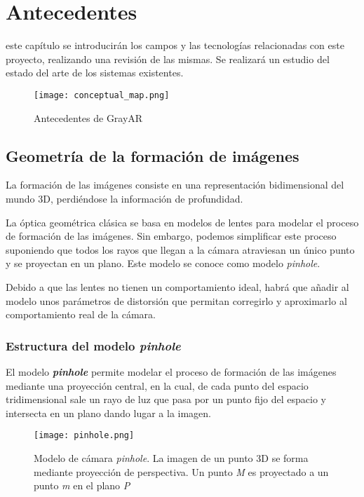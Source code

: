 \chapter{Antecedentes}
\label{chap:antecedentes}

 este capítulo se introducirán los campos y las tecnologías relacionadas con este
proyecto, realizando una revisión de las mismas. Se realizará un estudio del estado del
arte de los sistemas existentes.

\begin{figure}[h!] 
  \centering
  \texttt{[image: conceptual\_map.png]}
  \caption{Antecedentes de GrayAR}
  \label{fig:antecedentes}
\end{figure}


\section{Geometría de la formación de imágenes}
La formación de las imágenes consiste en una representación bidimensional del mundo 3D, perdiéndose la información de profundidad.

La óptica geométrica clásica se basa en modelos de lentes para modelar el proceso de formación de las imágenes. Sin embargo, podemos simplificar este proceso suponiendo que todos los rayos que llegan a la cámara atraviesan un único punto y se proyectan en un plano. Este modelo se conoce como modelo \emph{pinhole}.

Debido a que las lentes no tienen un comportamiento ideal, habrá que añadir al modelo unos parámetros de distorsión que permitan corregirlo y aproximarlo al comportamiento real de la cámara.

\subsection{Estructura del modelo \textit{pinhole}}
El modelo \textbf{\textit{pinhole}} \cite{Hartley} permite modelar el proceso de formación de las imágenes mediante una proyección central, en la cual, de cada punto del espacio tridimensional sale un rayo de luz que pasa por un punto fijo del espacio y intersecta en un plano dando lugar a la imagen.

\begin{figure}[h!]
  \centering
  \texttt{[image: pinhole.png]}
  \caption{Modelo de cámara \textit{pinhole}. La imagen de un punto 3D se forma mediante proyección de perspectiva. Un punto \textit{M} es proyectado a un punto \textit{m} en el plano \textit{P}}
  \label{fig:pinholeCamera}
\end{figure}

